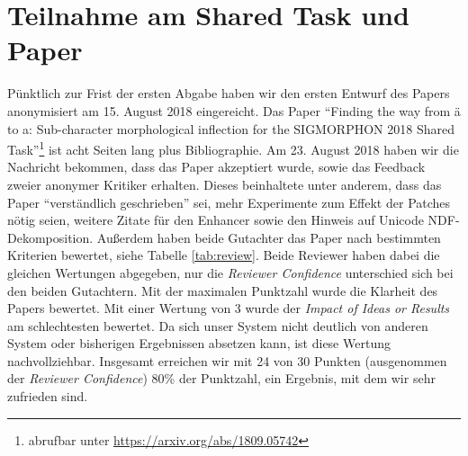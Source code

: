 \documentclass[a4paper]{article}
\begin{document}
\section{Teilnahme am Shared Task und Paper}
\label{sec:paper}

Pünktlich zur Frist der ersten Abgabe haben wir den ersten Entwurf des Papers anonymisiert am 15. August 2018 eingereicht. Das Paper \enquote{Finding the way from ä to a: Sub-character morphological inflection for the SIGMORPHON 2018 Shared Task}\footnote{abrufbar unter \url{https://arxiv.org/abs/1809.05742}} ist acht Seiten lang plus Bibliographie. Am 23. August 2018 haben wir die Nachricht bekommen, dass das Paper akzeptiert wurde, sowie das Feedback zweier anonymer Kritiker erhalten. Dieses beinhaltete unter anderem, dass das Paper \enquote{verständlich geschrieben} sei, mehr Experimente zum Effekt der Patches nötig seien, weitere Zitate für den Enhancer sowie den Hinweis auf Unicode NDF-Dekomposition. Außerdem haben beide Gutachter das Paper nach bestimmten Kriterien bewertet, siehe Tabelle \ref{tab:review}. Beide Reviewer haben dabei die gleichen Wertungen abgegeben, nur die \textit{Reviewer Confidence} unterschied sich bei den beiden Gutachtern. Mit der maximalen Punktzahl wurde die Klarheit des Papers bewertet. Mit einer Wertung von 3 wurde der \textit{Impact of Ideas or Results} am schlechtesten bewertet. Da sich unser System nicht deutlich von anderen System oder bisherigen Ergebnissen absetzen kann, ist diese Wertung nachvollziehbar. Insgesamt erreichen wir mit 24 von 30 Punkten (ausgenommen der \textit{Reviewer Confidence}) 80\% der Punktzahl, ein Ergebnis, mit dem wir sehr zufrieden sind.
\end{document}
